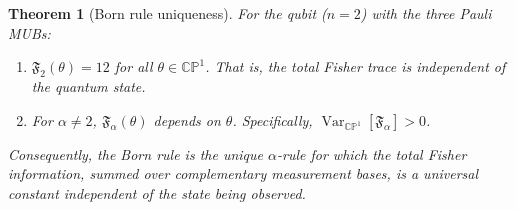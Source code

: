 \documentclass[12pt,a4paper]{article}
\newtheorem{theorem}{Theorem}[section]
\theoremstyle{definition}
\newcommand{\CP}{\mathbb{CP}}
\begin{document}
\begin{theorem}[Born rule uniqueness]
  \label{thm:born-uniqueness}
  For the qubit ($n = 2$) with the three Pauli MUBs:
  \begin{enumerate}[label=(\alph*)]
    \item $\mathfrak{F}_2(\theta) = 12$ for all
      $\theta \in \CP^1$. That is, the total Fisher trace is
      independent of the quantum state.
    \item For $\alpha \neq 2$, $\mathfrak{F}_\alpha(\theta)$
      depends on $\theta$. Specifically,
      $\operatorname{Var}_{\CP^1}[\mathfrak{F}_\alpha] > 0$.
  \end{enumerate}
  Consequently, the Born rule is the unique $\alpha$-rule for which the
  total Fisher information, summed over complementary measurement
  bases, is a universal constant independent of the state being
  observed.
\end{theorem}
\end{document}
